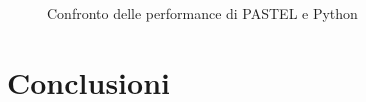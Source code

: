 \documentclass[]{article}
\begin{document}
\begin{figure}
	\centering
	\caption{Confronto delle performance di PASTEL e Python}
	\label{fig:performance-comparison}
\end{figure}


\section{Conclusioni}\label{section:conclusioni}






\end{document}
